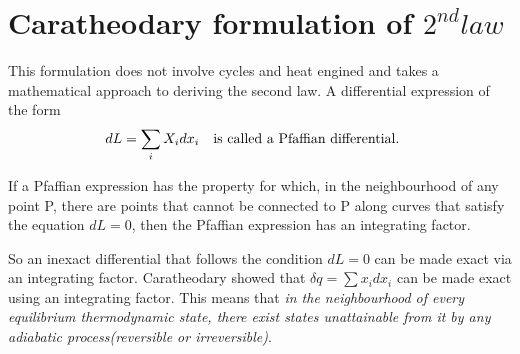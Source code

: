 \documentclass[12pt]{article}
\begin{document}
\section{Caratheodary formulation of $2^{nd} law$}
This formulation does not involve cycles and heat engined and takes a mathematical approach to deriving the second law. A differential expression of the form 
\begin{equation}
	dL=\sum_i X_i dx_i \qq{is called a Pfaffian differential.}
\end{equation}

\begin{tcolorbox}[title=Caratheodary's Theorem]
	If a Pfaffian expression has the property for which, in the neighbourhood of any point P, there are points that cannot be connected to P along curves that satisfy the equation $dL=0$, then the Pfaffian expression has an integrating factor.
\end{tcolorbox}
So an inexact differential that follows the condition $dL=0$ can be made exact via an integrating factor. Caratheodary showed that $\delta q=\sum x_i dx_i$ can be made exact using an integrating factor. This means that \textit{in the neighbourhood of every equilibrium thermodynamic state, there exist states unattainable from it by any adiabatic process(reversible or irreversible)}. 
\end{document}
